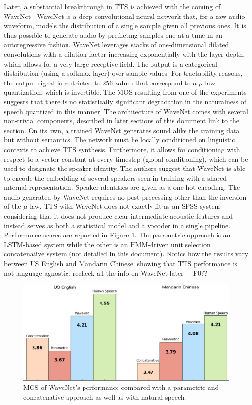 \documentclass[a4paper, oneside]{article}
\begin{document}
Later, a substantial breakthrough in TTS is achieved with the coming of WaveNet \citep{WaveNet}. WaveNet is a deep convolutional neural network that, for a raw audio waveform, models the distribution of a single sample given all previous ones. It is thus possible to generate audio by predicting samples one at a time in an autoregressive fashion. WaveNet leverages stacks of one-dimensional dilated convolutions with a dilation factor increasing exponentially with the layer depth, which allows for a very large receptive field.
The output is a categorical distribution (using a softmax layer) over sample values. For tractability reasons, the output signal is restricted to 256 values that correspond to a $\mu$-law quantization, which is invertible. The MOS resulting from one of the experiments suggests that there is no statistically significant degradation in the naturalness of speech quantized in this manner. The architecture of WaveNet comes with several non-trivial components, described in later sections of this document \color{red}link to the section\color{black}. On its own, a trained WaveNet generates sound alike the training data but without semantics. The network must be locally conditioned on linguistic contexts to achieve TTS synthesis. Furthermore, it allows for conditioning with respect to a vector constant at every timestep (global conditioning), which can be used to designate the speaker identity. The authors suggest that WaveNet is able to encode the embedding of several speakers seen in training with a shared internal representation. Speaker identities are given as a one-hot encoding. The audio generated by WaveNet requires no post-processing other than the inversion of the $\mu$-law. TTS with WaveNet does not exactly fit as an SPSS system considering that it does not produce clear intermediate acoustic features and instead serves as both a statistical model and a vocoder in a single pipeline. Performance scores are reported in Figure \ref{wavenet_results}. The parametric approach is an LSTM-based system while the other is an HMM-driven unit selection concatenative system (not detailed in this document). Notice how the results vary between US English and Mandarin Chinese, showing that TTS performance is not language agnostic. \color{red} recheck all the info on WaveNet later + F0??\color{black}

\begin{figure}[h]
	\centering
	\includegraphics[width=.7\linewidth]{images/wavenet_results_chart.png}
	\caption{MOS of WaveNet's performance compared with a parametric and concatenative approach as well as with natural speech.}
	\label{wavenet_results}
\end{figure}
\end{document}
